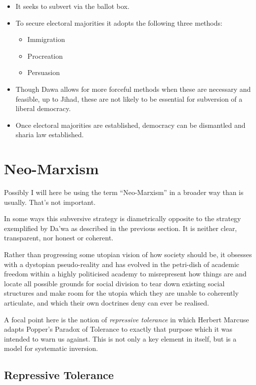 \documentclass[10pt,titlepage]{article}
\begin{document}
\begin{itemize}
\item It seeks to subvert via the ballot box.
\item To secure electoral majorities it adopts the following three methods:
  \begin{itemize}
  \item Immigration
  \item Procreation
  \item Persuasion
\end{itemize}
\item Though Dawa allows for more forceful methods when these are necessary and feasible, up to Jihad, these are not likely to be essential for subversion of a liberal democracy.
\item Once electoral majorities are established, democracy can be dismantled and sharia law established.
\end{itemize}

\section{Neo-Marxism}

Possibly I will here be using the term ``Neo-Marxism'' in a broader way than is usually.
That's not important.

In some ways this subversive strategy is diametrically opposite to the strategy exemplified by Da'wa as described in the previous section.
It is neither clear, transparent, nor honest or coherent.

Rather than progressing some utopian vision of how society should be, it obsesses with a dystopian pseudo-reality and has evolved in the petri-dish of academic freedom within a highly politicised academy to misrepresent how things are and locate all possible grounds for social division to tear down existing social structures and make room for the utopia which they are unable to coherently articulate, and which their own doctrines deny can ever be realised.

A focal point here is the notion of \emph{repressive tolerance} in which Herbert Marcuse adapts Popper's Paradox of Tolerance to exactly that purpose which it was intended to warn us against\cite{marcuse-repressive}.
This is not only a key element in itself, but is a model for systematic inversion.


\subsection{Repressive Tolerance}
\end{document}

